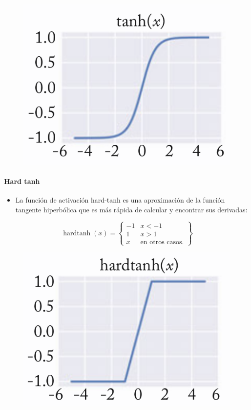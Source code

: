 \begin{figure}[htb]
	\centering
	 \includegraphics[scale=0.3]{pics/tanh.png}
\end{figure}

\paragraph{Hard tanh}
\begin{itemize}
\item La función de activación hard-tanh es una aproximación de la función tangente hiperbólica que es más rápida de calcular y encontrar sus derivadas:
\end{itemize}

  \[
    \operatorname{hardtanh}(x) = \left\{\begin{array}{lr}
        -1 & x < -1\\
        1 & x > 1\\
        x & \text{en otros casos.}
        \end{array} \right\}
  \]

\begin{figure}[htb]
	\centering
	 \includegraphics[scale=0.3]{pics/hardtanh.png}
\end{figure}


